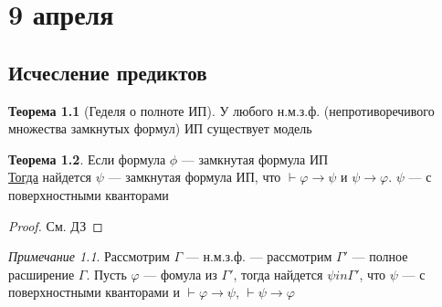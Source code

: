 \documentclass[oneside]{book}
\theoremstyle{plain}
\theoremstyle{remark}
\newtheorem*{remark}{Примечание}
\theoremstyle{definition}
\newtheorem{theorem}{Теорема}[section]
\begin{document}
\chapter{9 апреля}
\label{sec:orgfc80ea0}
\section{Исчесление предиктов}
\label{sec:org6da72e6}
\begin{theorem}[Геделя о полноте ИП]
У любого н.м.з.ф. (непротиворечивого множества замкнутых формул) ИП существует модель
\end{theorem}
\begin{theorem}
Если формула \(\phi\) --- замкнутая формула ИП \\
\uline{Тогда} найдется \(\psi\) --- замкнутая формула ИП, что \(\vdash \varphi \to \psi\) и \(\psi \to \varphi\). \(\psi\) --- с поверхностными кванторами
\end{theorem}
\begin{proof}
См. ДЗ
\end{proof}
\begin{remark}
Рассмотрим \(\Gamma\) --- н.м.з.ф. --- рассмотрим \(\Gamma'\) --- полное расширение \(\Gamma\). Пусть \(\varphi\) --- фомула из \(\Gamma'\), тогда найдется \(\psi in \Gamma'\), что \(\psi\) --- с поверхностными кванторами и \(\vdash \varphi \to \psi\), \(\vdash \psi \to \varphi\)
\end{remark}
\end{document}
